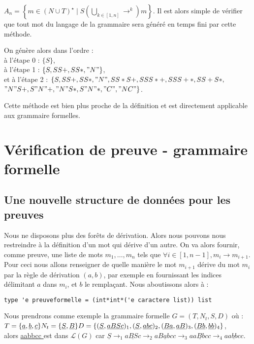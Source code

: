 \documentclass[a4paper,12pt]{article}
\begin{document}
$A_n = \left\{m \in (N \cup T)^\star \mid  S \left(\bigcup_{k \in [1,n]} \rightarrow^k\right) m\right\}$.
Il est alors simple de vérifier que tout mot du langage de la grammaire sera généré en temps fini par cette méthode.

On génère alors dans l'ordre :\\
à l'étape 0 : $\{S\}$, \\
à l'étape 1 : $\{S,SS+,SS*,"N"\}$,\\
et à l'étape 2 : $\{S,SS+,SS*,"N",SS*S+,SSS*+,SSS+*,SS+S*,$ \\
$"N"S+,S"N"+,"N"S*,S"N"*,"C","NC"\}$.

Cette méthode est bien plus proche de la définition et est directement applicable aux grammaire formelles.

\section{Vérification de preuve - grammaire formelle}

\subsection{Une nouvelle structure de données pour les preuves}

Nous ne disposons plus des forêts de dérivation. Alors nous pouvons nous restreindre à la définition d'un mot qui dérive d'un autre.
On va alors fournir, comme preuve, une liste de mots $m_1, \dots, m_n$ tels que $\forall i\in [1,n-1], m_i \rightarrow m_{i+1}$. 
Pour ceci nous allons renseigner de quelle manière le mot $m_{i+1}$ dérive du mot $m_i$ par la règle de dérivation $(a,b)$, par exemple en fournissant les indices délimitant $a$ dans $m_i$, et $b$ le remplaçant.
Nous aboutissons alors à :
{\color{DarkBlue}\begin{verbatim}
type 'e preuveformelle = (int*int*('e caractere list)) list
\end{verbatim}}

Nous prendrons comme exemple la grammaire formelle $G = (T,N_t,S,D)$ où :\\
$
T = \{\underline{ a },\underline{ b },\underline{ c }\}\\
N_t = \{\underline{ S },\underline{ B }\}\\
D = \{(\underline{ S },\underline{ aBSc })_1,(\underline{ S },\underline{ abc })_2,(\underline{ Ba },\underline{ aB })_3,(\underline{ Bb },\underline{ bb })_4\}
$,\\
alors \underline{ aabbcc } est dans $\mathcal{L}(G)$ car $\underline{ S } \rightarrow_1 \underline{ aBSc } \rightarrow_2 \underline{ aBabcc } \rightarrow_3 \underline{ aaBbcc } \rightarrow_4 \underline{ aabbcc }$.\\
\end{document}
